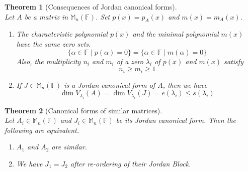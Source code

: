 \documentclass[12pt]{article}
\newtheorem{theorem}{Theorem}[section]
\theoremstyle{definition}
\begin{document}
\begin{theorem}[Consequences of Jordan canonical forms]
\hfill\\\normalfont Let $A$ be a matrix in $\mathbb{M}_n(\mathbb{F})$. Set $p(x)=p_A(x)$ and $m(x)=m_A(x)$.
\begin{enumerate}
\item The characteristic polynomial $p(x)$ and the minimal polynomial $m(x)$ have the same zero sets.
\[
\{\alpha\in\mathbb{F}\mid p(\alpha)=0\}=\{\alpha\in\mathbb{F}\mid m(\alpha)=0\}
\]
Also, the multiplicity $n_i$ and $m_i$ of a zero $\lambda_i$ of $p(x)$ and $m(x)$ satisfy
\[
n_i\geq m_i\geq 1
\]
\item If $J\in\mathbb{M}_n(\mathbb{F})$ is a Jordan canonical form of $A$, then we have
\[
\dim V_{\lambda_i}(A)=\dim V_{\lambda_i}(J)=e(\lambda_i)\leq s(\lambda_i)
\]
\end{enumerate}
\end{theorem}
\begin{theorem}[Canonical forms of similar matrices]
\hfill\\\normalfont Let $A_i\in\mathbb{M}_n(\mathbb{F})$ and $J_i\in\mathbb{M}_n(\mathbb{F})$ be its Jordan canonical form. Then the following are equivalent.
\begin{enumerate}[label=(\arabic*)]
\item $A_1$ and $A_2$ are similar.
\item We have $J_1=J_2$ after re-ordering of their Jordan Block.
\end{enumerate}
\end{theorem}
\end{document}
